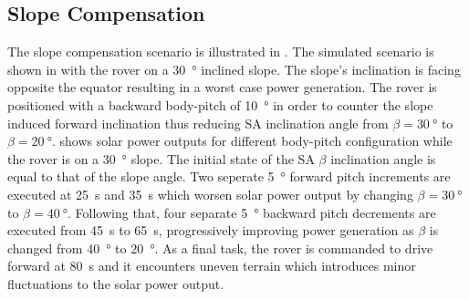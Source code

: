 \subsection{Slope Compensation}

The slope compensation scenario is illustrated in . The simulated scenario is shown in  with the rover on a \SI{30}{\degree} inclined slope. The slope's inclination is facing opposite the equator resulting in a worst case power generation. The rover is positioned with a backward body-pitch of \SI{10}{\degree} in order to counter the slope induced forward inclination thus reducing \ac{SA} inclination angle from $\beta=\SI{30}{\degree}$ to $\beta=\SI{20}{\degree}$.  shows solar power outputs for different body-pitch configuration while the rover is on a \SI{30}{\degree} slope. The initial state of the \ac{SA} $\beta$ inclination angle is equal to that of the slope angle. Two seperate \SI{5}{\degree} forward pitch increments are executed at \SI{25}{\second} and \SI{35}{\second} which worsen solar power output by changing $\beta=\SI{30}{\degree}$ to $\beta=\SI{40}{\degree}$. Following that, four separate \SI{5}{\degree} backward pitch decrements are executed from \SI{45}{\second} to \SI{65}{\second}, progressively improving power generation as $\beta$ is changed from \SI{40}{\degree} to \SI{20}{\degree}. As a final task, the rover is commanded to drive forward at \SI{80}{\second} and it encounters uneven terrain which introduces minor fluctuations to the solar power output.

